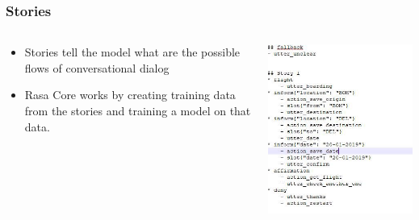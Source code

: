  \begin{frame}[fragile]\frametitle{Stories }
 
    \begin{columns}
    \begin{column}[t]{0.5\linewidth}
\begin{itemize}
\item Stories tell the model what are the possible flows of conversational dialog
\item Rasa Core works by creating training data from the stories and training a model on that data.
\end{itemize}
\end{column}
    \begin{column}[t]{0.5\linewidth}
\begin{center}
\includegraphics[width=\linewidth,keepaspectratio]{images/mmt7}
\end{center}
\end{column}
\end{columns}
\end{frame}

